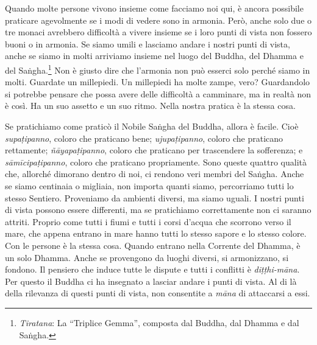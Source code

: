 Quando molte persone vivono insieme come facciamo noi qui, è ancora
possibile praticare agevolmente se i modi di vedere sono in armonia.
Però, anche solo due o tre monaci avrebbero difficoltà a vivere insieme
se i loro punti di vista non fossero buoni o in armonia. Se siamo umili
e lasciamo andare i nostri punti di vista, anche se siamo in molti
arriviamo insieme nel luogo del Buddha, del Dhamma e del
Saṅgha.\footnote{\emph{Tiratana}: La ``Triplice Gemma'', composta dal
  Buddha, dal Dhamma e dal Saṅgha.} Non è giusto dire che l'armonia non
può esserci solo perché siamo in molti. Guardate un millepiedi. Un
millepiedi ha molte zampe, vero? Guardandolo si potrebbe pensare che
possa avere delle difficoltà a camminare, ma in realtà non è così. Ha un
suo assetto e un suo ritmo. Nella nostra pratica è la stessa cosa.

Se pratichiamo come praticò il Nobile Saṅgha del Buddha, allora è
facile. Cioè \emph{supaṭipanno}, coloro che praticano bene;
\emph{ujupaṭipanno}, coloro che praticano rettamente;
\emph{ñāyapaṭipanno}, coloro che praticano per trascendere la
sofferenza; e \emph{sāmīcipaṭipanno}, coloro che praticano propriamente.
Sono queste quattro qualità che, allorché dimorano dentro di noi, ci
rendono veri membri del Saṅgha. Anche se siamo centinaia o migliaia, non
importa quanti siamo, percorriamo tutti lo stesso Sentiero. Proveniamo
da ambienti diversi, ma siamo uguali. I nostri punti di vista possono
essere differenti, ma se pratichiamo correttamente non ci saranno
attriti. Proprio come tutti i fiumi e tutti i corsi d'acqua che scorrono
verso il mare, che appena entrano in mare hanno tutti lo stesso sapore e
lo stesso colore. Con le persone è la stessa cosa. Quando entrano nella
Corrente del Dhamma, è un solo Dhamma. Anche se provengono da luoghi
diversi, si armonizzano, si fondono. Il pensiero che induce tutte le
dispute e tutti i conflitti è \emph{diṭṭhi-māna}. Per questo il Buddha
ci ha insegnato a lasciar andare i punti di vista. Al di là della
rilevanza di questi punti di vista, non consentite a \emph{māna} di
attaccarsi a essi.

